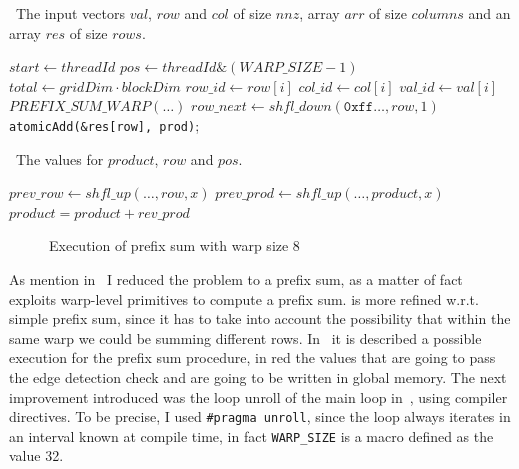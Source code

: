 \documentclass[conference]{IEEEtran}
\begin{document}
\begin{algorithm}[ht]
\caption{SpMV algorithm with WARP level primitives}
\algorithmicrequire~The input vectors \(val\), \(row\) and \(col\) of size \(nnz\), array \(arr\) of size \(columns\) and an array \(res\) of size \(rows\).
\begin{algorithmic}[1]\label{alg:warp}
  \State\(start\gets threadId\)
  \State\(pos\gets threadId\&(WARP\_SIZE - 1)\)
  \State\(total\gets gridDim\cdot blockDim\)
    \State\(row\_id\gets row[i]\)
    \State\(col\_id\gets col[i]\)
    \State\(val\_id\gets val[i]\)
    \State\(PREFIX\_SUM\_WARP(\dots)\)
    \State\(row\_next\gets shfl\_down(\texttt{0xff}\dots, row, 1)\)
      \State\texttt{atomicAdd(\&res[row], prod)};
    \EndIf%
  \EndFor%
\EndProcedure%
\end{algorithmic}
\end{algorithm}

\begin{algorithm}[ht]
\caption{Prefix-sum with WARP level primitives}
\algorithmicrequire~The values for \(product\), \(row\) and \(pos\).
\begin{algorithmic}[1]\label{alg:sum-warp}
      \State\(prev\_row\gets shfl\_up(\dots, row, x)\)
      \State\(prev\_prod\gets shfl\_up(\dots, product, x)\)
        \State\(product = product + rev\_prod\)
      \EndIf%
    \EndFor%
  \EndProcedure%
\end{algorithmic}
\end{algorithm}

\begin{figure}[ht]
  \centering
  
\caption{Execution of prefix sum with warp size 8}\label{fig:warp-sum}
\end{figure}

As mention in~ I reduced the problem to a prefix sum, as a matter of fact~ exploits warp-level primitives to compute a prefix sum.  is more refined w.r.t. simple prefix sum, since it has to take into account the possibility that within the same warp we could be summing different rows. In~ it is described a possible execution for the prefix sum procedure, in red the values that are going to pass the edge detection check and are going to be written in global memory. The next improvement introduced was the loop unroll of the main loop in~, using compiler directives. To be precise, I used \texttt{\#pragma unroll}, since the loop always iterates in an interval known at compile time, in fact \texttt{WARP\_SIZE} is a macro defined as the value 32.
\end{document}
